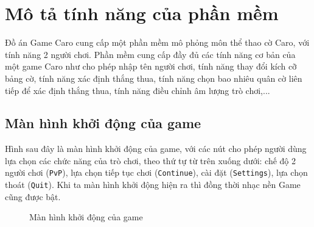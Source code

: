 \section{Mô tả tính năng của phần mềm}
Đồ án Game Caro cung cấp một phần mềm mô phỏng môn thể thao cờ Caro, với tính năng 2 người chơi. Phần mềm cung cấp đầy đủ các tính năng cơ bản của một game Caro như cho phép nhập tên người chơi, tính năng thay đổi kích cỡ bảng cờ, tính năng xác định thắng thua, tính năng chọn bao nhiêu quân cờ liên tiếp để xác định thắng thua, tính năng điều chỉnh âm lượng trò chơi,...

\subsection{Màn hình khởi động của game}
Hình sau đây là màn hình khởi động của game, với các nút cho phép người dùng lựa chọn các chức năng của trò chơi, theo thứ tự từ trên xuống dưới: chế độ 2 người chơi (\verb|PvP|), lựa chọn tiếp tục chơi (\verb|Continue|), cài đặt (\verb|Settings|), lựa chọn thoát (\verb|Quit|). Khi ta màn hình khởi động hiện ra thì đồng thời nhạc nền Game cũng được bật.

\begin{figure}[H]
\caption{Màn hình khởi động của game}
\end{figure}
